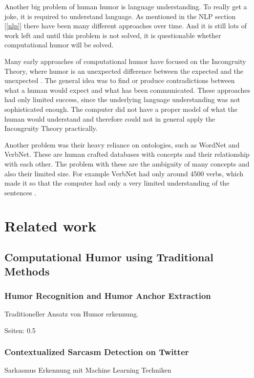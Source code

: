 \documentclass[draft,final,oneside]{vutinfth} %
\begin{document}
Another big problem of human humor is language understanding. To really get a joke, it is required to understand language. As mentioned in the NLP section [\ref{nlp}] there have been many different approaches over time. And it is still lots of work left and until this problem is not solved, it is questionable whether computational humor will be solved.

Many early approaches of computational humor have focused on the Incongruity Theory, where humor is an unexpected difference between the expected and the unexpected \cite{comphumorsummary}. The general idea was to find or produce contradictions between what a human would expect and what has been communicated. These approaches had only limited success, since the underlying language understanding was not sophisticated enough. The computer did not have a proper model of what the human would understand and therefore could not in general apply the Incongruity Theory practically.

Another problem was their heavy reliance on ontologies, such as WordNet and VerbNet. These are human crafted databases with concepts and their relationship with each other. The problem with these are the ambiguity of many concepts and also their limited size. For example VerbNet had only around 4500 verbs, which made it so that the computer had only a very limited understanding of the sentences \cite{comphumorsummary}	.

\fi


\section{Related work}


\subsection{Computational Humor using Traditional Methods}

\subsubsection{Humor Recognition and Humor Anchor Extraction}
Traditioneller Ansatz von Humor erkennung.

\cite{Yang2015HumorRA}

Seiten: 0.5

\subsubsection{Contextualized Sarcasm Detection on Twitter}
Sarkasmus Erkennung mit Machine Learning Techniken
\end{document}
